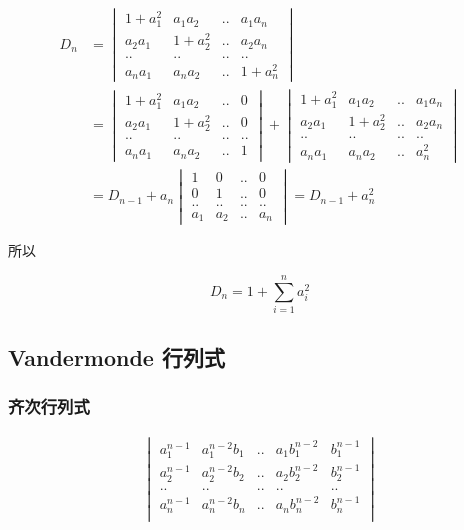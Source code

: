 \documentclass[12pt,a4paper]{ctexart}
\begin{document}
\begin{align*}
    D_n &= \begin{vmatrix}
        1+a_1^2 & a_1a_2 & .. & a_1a_n \\
        a_2a_1 & 1+a_2^2 & .. & a_2a_n \\
        .. & .. & .. & .. \\
        a_na_1 & a_na_2 & .. & 1 + a_n^2  
    \end{vmatrix} \\
    &= \begin{vmatrix}
        1+a_1^2 & a_1a_2 & .. & 0 \\
        a_2a_1 & 1+a_2^2 & .. & 0 \\
        .. & .. & .. & .. \\
        a_na_1 & a_na_2 & .. & 1  
    \end{vmatrix} + \begin{vmatrix}
        1+a_1^2 & a_1a_2 & .. & a_1a_n \\
        a_2a_1 & 1+a_2^2 & .. & a_2a_n \\
        .. & .. & .. & .. \\
        a_na_1 & a_na_2 & .. & a_n^2  
    \end{vmatrix} \\
    &= D_{n-1} + a_n \begin{vmatrix}
        1 & 0 & .. & 0 \\
        0 & 1 & .. & 0 \\
        .. & .. & .. & .. \\
        a_1 & a_2 & .. & a_n
    \end{vmatrix} = D_{n-1} + a_n^2
\end{align*}

所以 

\[
D_n = 1 + \sum_{i=1}^{n}a_i^2
\]

\subsection{Vandermonde 行列式}

\subsubsection{齐次行列式}

\begin{align*}
    \begin{vmatrix}
        a_1^{n-1} & a_1^{n-2}b_1 & .. & a_1b_1^{n-2} & b_1^{n-1} \\
        a_2^{n-1} & a_2^{n-2}b_2 & .. & a_2b_2^{n-2} & b_2^{n-1} \\
        .. & .. &.. &.. &..  \\ 
        a_n^{n-1} & a_n^{n-2}b_n & .. & a_nb_n^{n-2} & b_n^{n-1} \\
    \end{vmatrix}
\end{align*}
\end{document}

